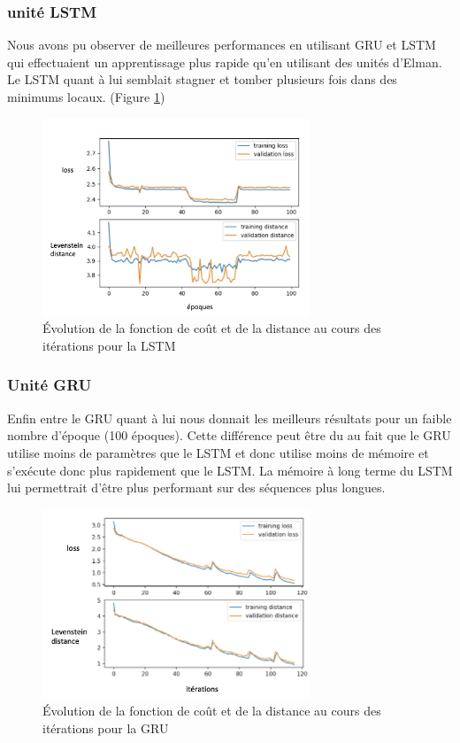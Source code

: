     
    \subsubsection{unité LSTM}
        Nous avons pu observer de meilleures performances en utilisant GRU et LSTM qui effectuaient un apprentissage plus rapide qu'en utilisant des unités d'Elman. Le LSTM quant à lui semblait stagner et tomber plusieurs fois dans des minimums locaux. (Figure \ref{fig:Figure 4  })
    
        \begin{figure}[!ht]
            \centering
            \includegraphics[width=80mm]{sections/images/architecture/LSTM.png}
            \caption{Évolution de la fonction de coût et de la distance au cours des itérations pour la LSTM}
            \label{fig:Figure 4  }
        \end{figure}
        
    \subsubsection{Unité GRU}
        Enfin entre le GRU quant à lui nous donnait les meilleurs résultats pour un faible nombre d'époque (100 époques). Cette différence peut être du au fait que le GRU utilise moins de paramètres que le LSTM et donc utilise moins de mémoire et s'exécute donc plus rapidement que le LSTM. La mémoire à long terme du LSTM lui permettrait d'être plus performant sur des séquences plus longues.
    
        \begin{figure}[!ht]
            \centering
            \includegraphics[width=80mm]{sections/images/architecture/GRU.png}
            \caption{Évolution de la fonction de coût et de la distance au cours des itérations pour la GRU}
            \label{fig:Figure 5  }
        \end{figure}

